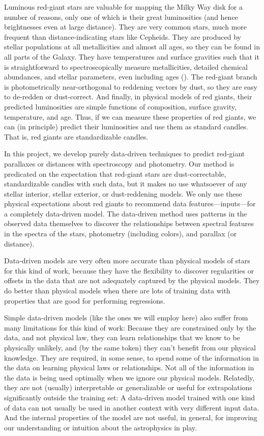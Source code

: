 \documentclass[modern]{aastex62}
\begin{document}
Luminous red-giant stars are valuable for mapping the Milky Way disk for a number
of reasons, only one of which is their great luminosities (and hence brightnesses
even at large distance).
They are very common stars, much more frequent than distance-indicating
stars like Cepheids.
They are produced by stellar populations at all metallicities and almost all ages,
so they can be found in all parts of the Galaxy.
They have temperatures and surface gravities such that it is
straightforward to spectroscopically measure metallicities,
detailed chemical abundances, and stellar parameters, even including ages (\citealt{martig, nessage}).
The red-giant branch is photometrically near-orthogonal to reddening vectors by dust,
so they are easy to de-redden or dust-correct.
And finally, in physical models of red giants, their predicted luminosities are simple
functions of composition, surface gravity, temperature, and age.
Thus, if we can measure these properties of red giants, we can (in principle) predict
their luminosities and use them as standard candles.
That is, red giants are standardizable candles.

In this project, we develop purely data-driven techniques to predict
red-giant parallaxes or distances with spectroscopy and photometry.
Our method is predicated on the expectation that red-giant stars are dust-correctable,
standardizable candles with such data,
but it makes no use whatsoever of any stellar interior,
stellar exterior, or dust-reddening models.
We only use these physical expectations about red giants to recommend
data features---inputs---for a completely data-driven model.
The data-driven method uses patterns in the observed data themselves
to discover the relationships between spectral features in the spectra of the stars,
photometry (including colors), and parallax (or distance).

Data-driven models are very often more accurate than physical models of stars
for this kind of work, because they have the flexibility to discover
regularities or offsets in the data that are not adequately captured by the physical
models.
They do better than physical models when there are lots of training data
with properties that are good for performing regressions.

Simple data-driven models (like the ones we will employ here)
also suffer from many limitations for this kind of work:
Because they are constrained only by the data, and not physical law,
they can learn relationships that we know
to be physically unlikely, and (by the same token) they can't benefit from our
physical knowledge.
They are required, in some sense, to spend some of the information in the data on
learning physical laws or relationships.
Not all of the information in the data is being used
optimally when we ignore our physical models.
Relatedly, they are not (usually) interpretable or generalizable or useful for
extrapolations significantly outside the training set:
A data-driven model trained with one kind of data can not usually be used in another
context with very different input data.
And the internal properties of the model are not useful, in general, for improving
our understanding or intuition about the astrophysics in play.
\end{document}
